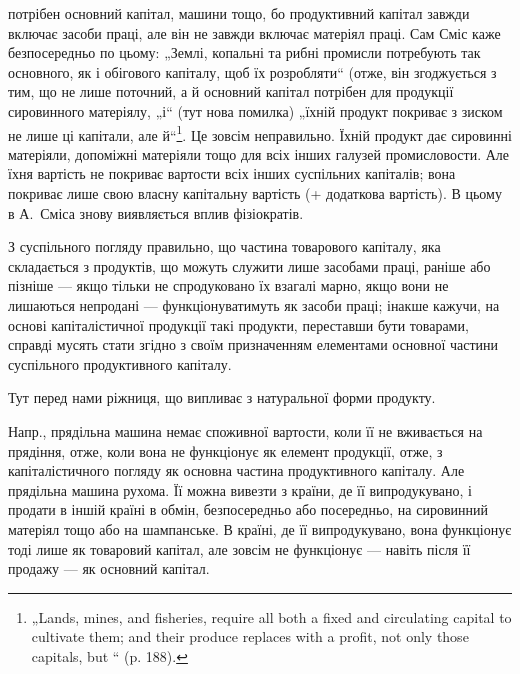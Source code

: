 \parcont{}  %
потрібен основний капітал, машини тощо, бо продуктивний капітал завжди
включає засоби праці, але він не завжди включає матеріял праці. Сам
Сміс каже безпосередньо по цьому: „Землі, копальні та рибні промисли
потребують так основного, як і обігового капіталу, щоб їх розробляти“
(отже, він згоджується з тим, що не лише поточний, а й основний капітал
потрібен для продукції сировинного матеріялу, „і“ (тут нова помилка)
„їхній продукт покриває з зиском не лише ці капітали, але й“\footnote*{
„Lands, mines, and fisheries, require all both a fixed and circulating capital
to cultivate them; and their produce replaces with a profit, not only those capitals,
but “ (p. 188).
}. Це зовсім неправильно. Їхній продукт
дає сировинні матеріяли, допоміжні матеріяли тощо для всіх інших галузей
промисловости. Але їхня вартість не покриває вартости всіх інших
суспільних капіталів; вона покриває лише свою власну капітальну вартість
(+ додаткова вартість). В цьому в А.~Сміса знову виявляється
вплив фізіократів.

З суспільного погляду правильно, що частина товарового капіталу,
яка складається з продуктів, що можуть служити лише засобами праці,
раніше або пізніше — якщо тільки не спродуковано їх взагалі марно,
якщо вони не лишаються непродані — функціонуватимуть як засоби праці;
інакше кажучи, на основі капіталістичної продукції такі продукти,
переставши бути товарами, справді мусять стати згідно з своїм призначенням
елементами основної частини суспільного продуктивного капіталу.

Тут перед нами ріжниця, що випливає з натуральної форми продукту.

Напр., прядільна машина немає споживної вартости, коли її не вживається
на прядіння, отже, коли вона не функціонує як елемент продукції,
отже, з капіталістичного погляду як основна частина продуктивного
капіталу. Але прядільна машина рухома. Її можна вивезти з країни, де
її випродукувано, і продати в іншій країні в обмін, безпосередньо або
посередньо, на сировинний матеріял тощо або на шампанське. В країні,
де її випродукувано, вона функціонує тоді лише як товаровий капітал,
але зовсім не функціонує — навіть після її продажу — як основний капітал.

